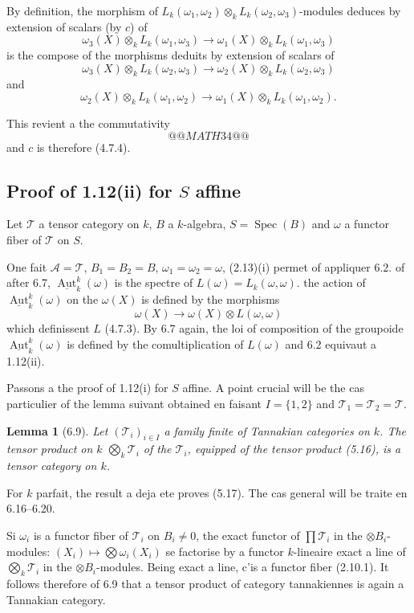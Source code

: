 \documentclass[12pt,a4paper]{article}
\theoremstyle{plain}
\newtheorem{lemma}[theorem]{Lemma}
\theoremstyle{definition}
\DeclareMathOperator{\Spec}{Spec}
\DeclareMathOperator{\Aut}{Aut}
\begin{document}
By definition, the morphism of $L_k(\omega_1, \omega_2) \otimes_k L_k(\omega_2, \omega_3)$-modules deduces by extension of scalars (by $c$) of
\[
\omega_3(X) \otimes_k L_k(\omega_1, \omega_3) \to \omega_1(X) \otimes_k L_k(\omega_1, \omega_3)
\]
is the compose of the morphisms deduits by extension of scalars of
\[
\omega_3(X) \otimes_k L_k(\omega_2, \omega_3) \to \omega_2(X) \otimes_k L_k(\omega_2, \omega_3)
\]
and
\[
\omega_2(X) \otimes_k L_k(\omega_1, \omega_2) \to \omega_1(X) \otimes_k L_k(\omega_1, \omega_2).
\]

This revient a the commutativity
\[
@@MATH34@@
\]
and $c$ is therefore (4.7.4).

\subsection{Proof of 1.12(ii) for $S$ affine}

Let $\mathcal{T}$ a tensor category on $k$, $B$ a $k$-algebra, $S = \Spec(B)$ and $\omega$ a functor fiber of $\mathcal{T}$ on $S$.

One fait $\mathcal{A} = \mathcal{T}$, $B_1 = B_2 = B$, $\omega_1 = \omega_2 = \omega$, (2.13)(i) permet of appliquer 6.2. of after 6.7, $\underline{\Aut}^k_k(\omega)$ is the spectre of $L(\omega) = L_k(\omega, \omega)$. the action of $\underline{\Aut}^k_k(\omega)$ on the $\omega(X)$ is defined by the morphisms
\[
\omega(X) \to \omega(X) \otimes L(\omega, \omega)
\]
which definissent $L$ (4.7.3). By 6.7 again, the loi of composition of the groupoide $\underline{\Aut}^k_k(\omega)$ is defined by the comultiplication of $L(\omega)$ and 6.2 equivaut a 1.12(ii).

Passons a the proof of 1.12(i) for $S$ affine. A point crucial will be the cas particulier of the lemma suivant obtained en faisant $I = \{1, 2\}$ and $\mathcal{T}_1 = \mathcal{T}_2 = \mathcal{T}$.

\begin{lemma}[6.9]
Let $(\mathcal{T}_i)_{i \in I}$ a family finite of Tannakian categories on $k$. The tensor product on $k$ $\bigotimes_k \mathcal{T}_i$ of the $\mathcal{T}_i$, equipped of the tensor product (5.16), is a tensor category on $k$.
\end{lemma}

For $k$ parfait, the result a deja ete proves (5.17). The cas general will be traite en 6.16--6.20.

Si $\omega_i$ is a functor fiber of $\mathcal{T}_i$ on $B_i \neq 0$, the exact functor of $\prod \mathcal{T}_i$ in the $\otimes B_i$-modules: $(X_i) \mapsto \bigotimes \omega_i(X_i)$ se factorise by a functor $k$-lineaire exact a line of $\bigotimes_k \mathcal{T}_i$ in the $\otimes B_i$-modules. Being exact a line, c'is a functor fiber (2.10.1). It follows therefore of 6.9 that a tensor product of category tannakiennes is again a Tannakian category.
\end{document}

